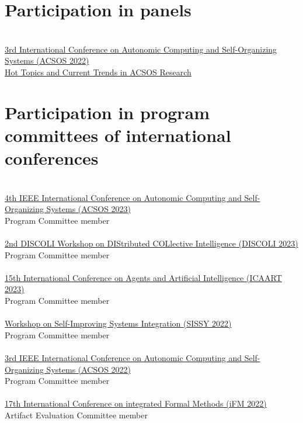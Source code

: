 \section{{\color{black}Participation in panels}}
\halfblankline \\
\href{https://2022.acsos.org/details/acsos-2022-papers/36/Hot-Topics-and-Current-Trends-in-ACSOS-Research}{3rd International Conference on Autonomic Computing and Self-Organizing Systems
    (ACSOS 2022)}
\\ \href{https://danysk.github.io/Slides-2022-ACSOS-Panel/#/}{Hot Topics and Current Trends in ACSOS Research} \\

\section{{\color{black}Participation in program committees of international conferences}}
\halfblankline \\
\href{https://2023.acsos.org/}{4th IEEE International Conference on Autonomic Computing and Self-Organizing Systems
    (ACSOS 2023)}
\\ Program Committee member \\
\halfblankline \\
\href{https://discoli-workshop.github.io/2023/}{2nd DISCOLI Workshop on DIStributed COLlective Intelligence (DISCOLI 2023)
}
\\ Program Committee member \\
\halfblankline \\
\href{https://icaart.scitevents.org/}{15th International Conference on Agents and Artificial Intelligence
(ICAART 2023)}
\\ Program Committee member \\
\halfblankline \\
\href{https://sissy.telecom-paristech.fr/}{Workshop on Self-Improving Systems Integration (SISSY 2022)}
\\ Program Committee member \\
\halfblankline \\
\href{https://conf.researchr.org/home/acsos-2022/}{3rd IEEE International Conference on Autonomic Computing and Self-Organizing Systems
(ACSOS 2022)}
\\ Program Committee member \\
\halfblankline \\
\href{https://ifm22.si.usi.ch/}{17th International Conference on integrated Formal Methods
(iFM 2022)}
\\ Artifact Evaluation Committee member \\
